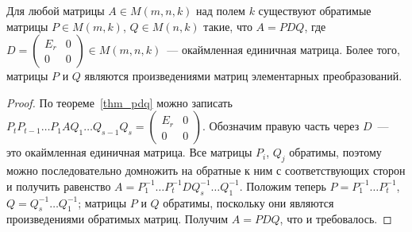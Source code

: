 \begin{corollary}\label{cor_pdq}
Для любой матрицы $A\in M(m,n,k)$ над полем $k$ существуют обратимые
матрицы $P\in M(m,k)$, $Q\in M(n,k)$ такие, что
$A=PDQ$, где $D=\begin{pmatrix}E_r&0\\0&0\end{pmatrix}\in
M(m,n,k)$~--- окаймленная единичная матрица. Более того, матрицы $P$ и
$Q$ являются произведениями матриц элементарных преобразований.
\end{corollary}
\begin{proof}
По теореме~\ref{thm_pdq} можно записать $P_tP_{t-1}\dots P_1AQ_1\dots
Q_{s-1}Q_s = \begin{pmatrix}E_r&0\\0&0\end{pmatrix}$. 
Обозначим правую часть через $D$~--- это окаймленная единичная матрица.
Все матрицы $P_i$,
$Q_j$ обратимы, поэтому можно последовательно домножить на обратные к
ним с соответствующих сторон и получить равенство
$A=P_1^{-1}\dots P_t^{-1}DQ_s^{-1}\dots Q_1^{-1}$. Положим
теперь $P=P_1^{-1}\dots P_t^{-1}$, $Q=Q_s^{-1}\dots Q_1^{-1}$; матрицы
$P$ и $Q$ обратимы, поскольку они являются произведениями обратимых
матриц. Получим $A=PDQ$, что и требовалось.
\end{proof}

